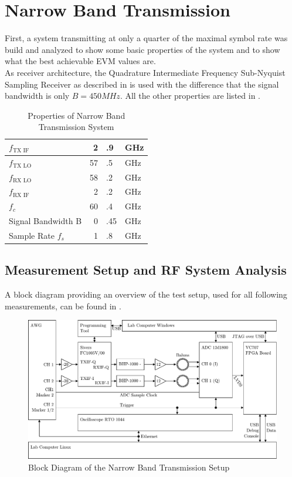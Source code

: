 \chapter{Narrow Band Transmission}
\label{chap:res_450}
First, a system transmitting at only a quarter of the maximal symbol rate
was build and analyzed to show some basic properties of the system and
to show what the best achievable \gls{EVM} values are. \\

As receiver architecture, the Quadrature Intermediate Frequency Sub-Nyquist
Sampling Receiver as described in  is used with the difference
that the signal bandwidth is only $B = 450 MHz$. All the other properties are listed
in . \\

\begin{table}[h]
  \centering
  \begin{tabular}{|l|r@{}l@{~}l|}
    \hline
    $f_{\text{TX IF}}$ & 2&.9&GHz \\ \hline
    $f_{\text{TX LO}}$ & 57&.5&GHz \\ \hline
    $f_{\text{RX LO}}$ & 58&.2&GHz \\ \hline
    $f_{\text{RX IF}}$ & 2&.2&GHz \\ \hline
    $f_c$            & 60&.4&GHz \\ \hline
    Signal Bandwidth B & 0&.45&GHz \\ \hline
    Sample Rate $f_s$ & 1&.8&GHz \\ \hline
  \end{tabular}
  \caption{Properties of Narrow Band Transmission System}
  \label{tab:res_450}
\end{table}

\section{Measurement Setup and RF System Analysis}
\label{sec:res_450_setup}

A block diagram providing an overview of the test setup,
used for all following measurements, can be found in . \\

\begin{figure}[p]
  \centering
  \includegraphics[width=\textwidth]{figures/res_450_setup}
  \caption{Block Diagram of the Narrow Band Transmission Setup}
  \label{fig:res_450_bd}
\end{figure}

